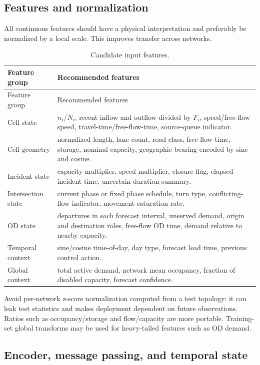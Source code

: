 \documentclass[11pt]{article}
\begin{document}
\subsection{Features and normalization}

All continuous features should have a physical interpretation and preferably be
normalized by a local scale.  This improves transfer across networks.

\begin{longtable}{@{}p{}p{}@{}}
\caption{Candidate input features.}\label{tab:features}\\
\toprule
Feature group & Recommended features \\
\midrule
\endfirsthead
\toprule
Feature group & Recommended features \\
\midrule
\endhead
Cell state & \(n_i/N_i\), recent inflow and outflow divided by \(F_i\), speed/free-flow speed, travel-time/free-flow-time, source-queue indicator. \\
Cell geometry & normalized length, lane count, road class, free-flow time, storage, nominal capacity, geographic bearing encoded by sine and cosine. \\
Incident state & capacity multiplier, speed multiplier, closure flag, elapsed incident time, uncertain duration summary. \\
Intersection state & current phase or fixed phase schedule, turn type, conflicting-flow indicator, movement saturation rate. \\
OD state & departures in each forecast interval, unserved demand, origin and destination roles, free-flow OD time, demand relative to nearby capacity. \\
Temporal context & sine/cosine time-of-day, day type, forecast lead time, previous control action. \\
Global context & total active demand, network mean occupancy, fraction of disabled capacity, forecast confidence. \\
\bottomrule
\end{longtable}

Avoid per-network z-score normalization computed from a test topology: it can leak test
statistics and makes deployment dependent on future observations.  Ratios such as
occupancy/storage and flow/capacity are more portable.  Training-set global transforms
may be used for heavy-tailed features such as OD demand.

\subsection{Encoder, message passing, and temporal state}
\end{document}
